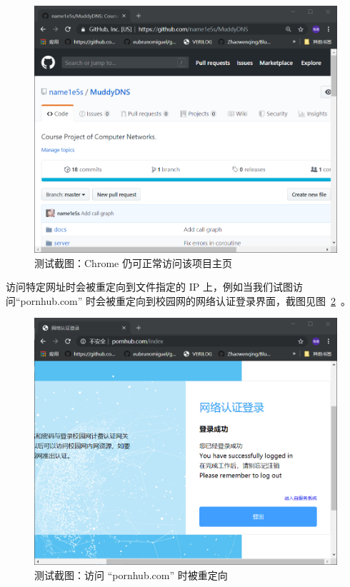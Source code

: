 \documentclass[blue,normal,cn]{elegantnote}
\begin{document}
\begin{figure}[!htbp]
	\centering
	\includegraphics[width=.9\textwidth]{test_chrome.png}
	\caption{测试截图：Chrome 仍可正常访问该项目主页}
	\label{test_chrome}
\end{figure}

访问特定网址时会被重定向到文件指定的 IP 上，例如当我们试图访问``pornhub.com'' 时会被重定向到校园网的网络认证登录界面，截图见图~\ref{test_phub}~。

\newpage

\begin{figure}[!htbp]
	\centering
	\includegraphics[width=.9\textwidth]{test_phub.png}
	\caption{测试截图：访问 ``pornhub.com'' 时被重定向}
	\label{test_phub}
\end{figure}
\end{document}
